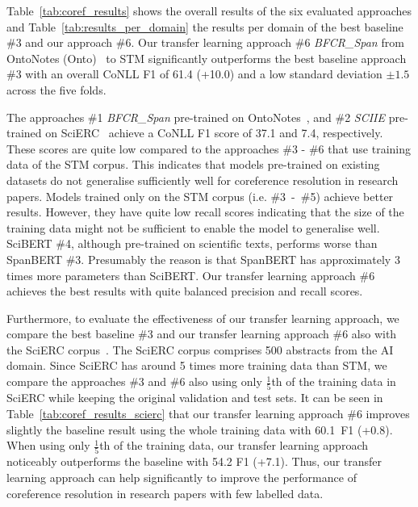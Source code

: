\documentclass[runningheads]{llncs}
\begin{document}
Table~\ref{tab:coref_results} shows the overall results of the six evaluated approaches and Table~\ref{tab:results_per_domain} the results per domain of the best baseline \#3 and our approach \#6. Our transfer learning approach \#6 \emph{BFCR\_Span} from OntoNotes (Onto)~\cite{Pradhan2013TowardsRL} to STM significantly outperforms the best baseline approach \#3 with an overall CoNLL F1 of 61.4 (+10.0) and a low standard deviation $\pm1.5$ across the five folds.

The approaches \#1 \emph{BFCR\_Span} pre-trained on OntoNotes~\cite{Pradhan2013TowardsRL}, and \#2 \emph{SCIIE} pre-trained on SciERC~\cite{Luan2018MultiTaskIO} achieve a CoNLL F1 score of 37.1 and 7.4, respectively. These scores are quite low compared to the approaches \#3 - \#6 that use training data of the STM corpus. 
This indicates that models pre-trained on existing datasets do not generalise sufficiently well for coreference resolution in research papers.
Models trained only on the STM corpus (i.e. \#3~-~\#5) achieve better results. However, they have quite low recall scores indicating that the size of the training data might not be sufficient to enable the model to generalise well. 
SciBERT \#4, although pre-trained on scientific texts, performs worse than SpanBERT \#3. Presumably the reason is that SpanBERT has approximately 3 times more parameters than SciBERT.
Our transfer learning approach \#6 achieves the best results with quite balanced precision and recall scores.

Furthermore, to evaluate the effectiveness of our transfer learning approach, we compare the best baseline \#3  and our transfer learning approach \#6 also with the SciERC corpus~\cite{Luan2018MultiTaskIO}. The SciERC corpus comprises 500 abstracts from the AI domain.
Since SciERC has around 5 times more training data than STM, we compare the approaches \#3 and \#6 also using only $\frac{1}{5}$th of the training data in SciERC while keeping the original validation and test sets.
It can be seen in Table~\ref{tab:coref_results_scierc} that our transfer learning approach \#6 improves slightly the baseline result using the whole training data with 60.1~F1 (+0.8).
When using only $\frac{1}{5}$th of the training data, our transfer learning approach noticeably outperforms the baseline with 54.2 F1 (+7.1).
Thus, our transfer learning approach can help significantly to improve the performance of coreference resolution in research papers with few labelled data.
\end{document}
